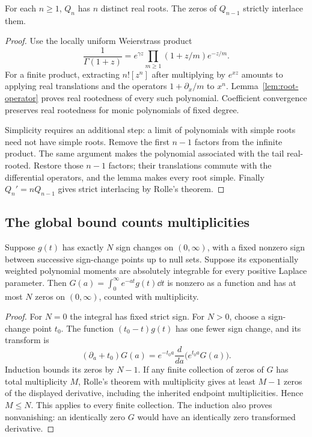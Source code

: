 \begin{proposition}\label{prop:Q-simple}
For each $n\ge1$, $Q_n$ has $n$ distinct real roots. The zeros of
$Q_{n-1}$ strictly interlace them.
\end{proposition}
\begin{proof}
Use the locally uniform Weierstrass product \cite{DLMFGamma}
\[
 \frac1{\Gamma(1+z)}=e^{\gamma z}
       \prod_{m\ge1}(1+z/m)e^{-z/m}.
\]
For a finite product, extracting $n![z^n]$ after multiplying by $e^{xz}$
amounts to applying real translations and the operators
$1+\partial_x/m$ to $x^n$. Lemma~\ref{lem:root-operator} proves real
rootedness of every such polynomial. Coefficient convergence preserves
real rootedness for monic polynomials of fixed degree.

Simplicity requires an additional step: a limit of polynomials with simple
roots need not have simple roots. Remove the first $n-1$ factors from the
infinite product. The same argument makes the polynomial associated with
the tail real-rooted. Restore those $n-1$ factors; their translations
commute with the differential operators, and the lemma makes every root
simple. Finally $Q_n'=nQ_{n-1}$ gives strict interlacing by Rolle's theorem.
\end{proof}

\subsection{The global bound counts multiplicities}

\begin{lemma}\label{lem:laplace-variation}
Suppose $g(t)$ has exactly $N$ sign changes on $(0,\infty)$, with a
fixed nonzero sign between successive sign-change points up to null sets.
Suppose its exponentially weighted polynomial moments are absolutely
integrable for every positive Laplace parameter. Then
$G(a)=\int_0^\infty e^{-at}g(t)\dd t$ is nonzero as a function and has
at most $N$ zeros on $(0,\infty)$, counted with multiplicity.
\end{lemma}
\begin{proof}
For $N=0$ the integral has fixed strict sign. For $N>0$, choose a
sign-change point $t_0$. The function $(t_0-t)g(t)$ has one fewer sign
change, and its transform is
\[
 (\partial_a+t_0)G(a)
 =e^{-t_0a}\frac{d}{da}\bigl(e^{t_0a}G(a)\bigr).
\]
Induction bounds its zeros by $N-1$. If any finite collection of zeros
of $G$ has total multiplicity $M$, Rolle's theorem with multiplicity
gives at least $M-1$ zeros of the displayed derivative, including the
inherited endpoint multiplicities. Hence $M\le N$. This applies to every
finite collection. The induction also proves nonvanishing: an identically
zero $G$ would have an identically zero transformed derivative.
\end{proof}

